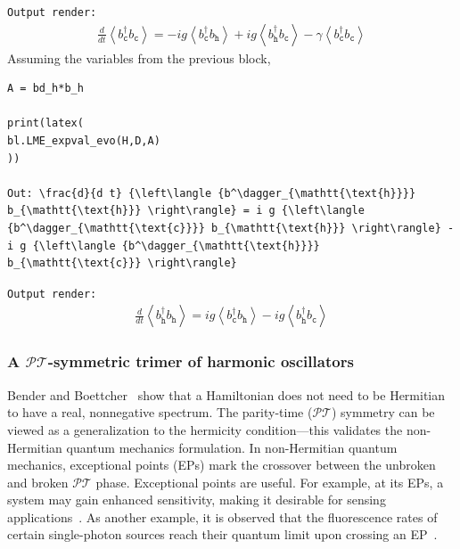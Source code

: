 \documentclass[5p, twocolumn, 10pt, sort&compress]{elsarticle}
\newcommand{\inlinecode}[1]{\texttt{#1}}
\newenvironment{revision2}{%
\color{red}
}
{}
\begin{document}
\begin{revision2}
\noindent\inlinecode{Output render:}
\begin{align*}
\frac{d}{d t} {\left\langle {b^\dagger_{\mathtt{\text{c}}}} b_{\mathtt{\text{c}}} \right\rangle} = - i g {\left\langle {b^\dagger_{\mathtt{\text{c}}}} b_{\mathtt{\text{h}}} \right\rangle} + i g {\left\langle {b^\dagger_{\mathtt{\text{h}}}} b_{\mathtt{\text{c}}} \right\rangle} - \gamma {\left\langle {b^\dagger_{\mathtt{\text{c}}}} b_{\mathtt{\text{c}}} \right\rangle}
\end{align*}
\end{revision2}
\noindent Assuming the variables from the previous block, 
\begin{verbatim}
A = bd_h*b_h

print(latex(
bl.LME_expval_evo(H,D,A)
))

Out: \frac{d}{d t} {\left\langle {b^\dagger_{\mathtt{\text{h}}}} b_{\mathtt{\text{h}}} \right\rangle} = i g {\left\langle {b^\dagger_{\mathtt{\text{c}}}} b_{\mathtt{\text{h}}} \right\rangle} - i g {\left\langle {b^\dagger_{\mathtt{\text{h}}}} b_{\mathtt{\text{c}}} \right\rangle}
\end{verbatim}
\begin{revision2}
\noindent\inlinecode{Output render:}
\begin{align*}
\frac{d}{d t} {\left\langle {b^\dagger_{\mathtt{\text{h}}}} b_{\mathtt{\text{h}}} \right\rangle} = i g {\left\langle {b^\dagger_{\mathtt{\text{c}}}} b_{\mathtt{\text{h}}} \right\rangle} - i g {\left\langle {b^\dagger_{\mathtt{\text{h}}}} b_{\mathtt{\text{c}}} \right\rangle}
\end{align*}
\end{revision2}


\subsubsection{A $\mathcal{P}\mathcal{T}$-symmetric trimer of harmonic oscillators}

Bender and Boettcher~\cite{Bender1998} show that a Hamiltonian does not need to be Hermitian to have a real, nonnegative spectrum. The parity-time ($\mathcal{P}\mathcal{T}$) symmetry can be viewed as a generalization to the hermicity condition---this validates the non-Hermitian quantum mechanics formulation. In non-Hermitian quantum mechanics, exceptional points (EPs) mark the crossover between the unbroken and broken $\mathcal{P}\mathcal{T}$ phase. Exceptional points are useful. For example, at its EPs, a system may gain enhanced sensitivity, making it desirable for sensing applications~\cite{Wiersig2020}. As another example, it is observed that the fluorescence rates of certain single-photon sources reach their quantum limit upon crossing an EP~\cite{Zhou2024}. 
\end{document}

